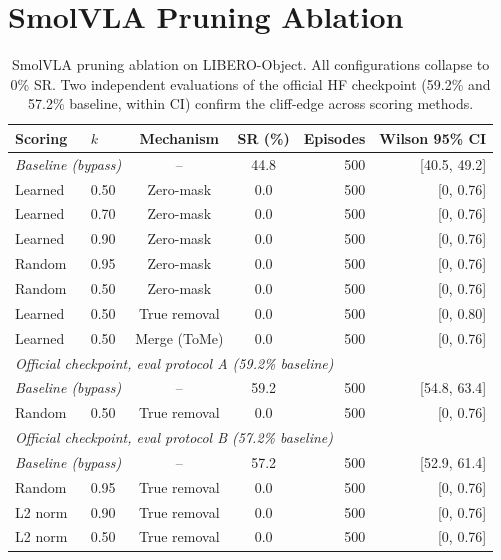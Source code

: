 \section{SmolVLA Pruning Ablation}
\label{app:smolvla_ablation}

\begin{table}[ht]
\centering
\small
\caption{SmolVLA pruning ablation on LIBERO-Object. All configurations collapse to 0\% SR. Two independent evaluations of the official HF checkpoint (59.2\% and 57.2\% baseline, within CI) confirm the cliff-edge across scoring methods.}
\label{tab:smolvla_ablation}
\begin{tabular}{llccrr}
\toprule
Scoring & $k$ & Mechanism & SR (\%) & Episodes & Wilson 95\% CI \\
\midrule
\multicolumn{2}{l}{\textit{Baseline (bypass)}} & -- & 44.8 & 500 & [40.5, 49.2] \\
\midrule
Learned & 0.50 & Zero-mask & 0.0 & 500 & [0, 0.76] \\
Learned & 0.70 & Zero-mask & 0.0 & 500 & [0, 0.76] \\
Learned & 0.90 & Zero-mask & 0.0 & 500 & [0, 0.76] \\
Random & 0.95 & Zero-mask & 0.0 & 500 & [0, 0.76] \\
Random & 0.50 & Zero-mask & 0.0 & 500 & [0, 0.76] \\
Learned & 0.50 & True removal & 0.0 & 500 & [0, 0.80] \\
Learned & 0.50 & Merge (ToMe) & 0.0 & 500 & [0, 0.76] \\
\midrule
\multicolumn{6}{l}{\textit{Official checkpoint, eval protocol A (59.2\% baseline)}} \\
\multicolumn{2}{l}{\textit{Baseline (bypass)}} & -- & 59.2 & 500 & [54.8, 63.4] \\
Random & 0.50 & True removal & 0.0 & 500 & [0, 0.76] \\
\midrule
\multicolumn{6}{l}{\textit{Official checkpoint, eval protocol B (57.2\% baseline)}} \\
\multicolumn{2}{l}{\textit{Baseline (bypass)}} & -- & 57.2 & 500 & [52.9, 61.4] \\
Random & 0.95 & True removal & 0.0 & 500 & [0, 0.76] \\
L2 norm & 0.90 & True removal & 0.0 & 500 & [0, 0.76] \\
L2 norm & 0.50 & True removal & 0.0 & 500 & [0, 0.76] \\
\bottomrule
\end{tabular}
\end{table}


